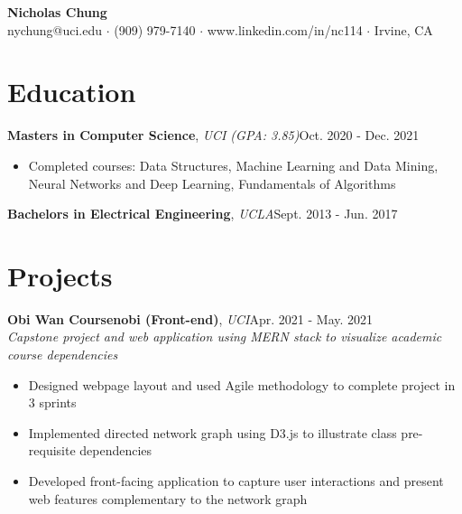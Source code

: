 \documentclass[12pt]{article}
\newcommand\firstboxx[2]{\textbf{\fontsize{12.8}{15}\selectfont #1}, \textit{#2}}
\newcommand{\itemheader}[3]{\firstboxx{#1}{#2}\hfill#3}
\begin{document}
\begin{center}
	\textbf{\LARGE Nicholas Chung} \\ \vspace{.5ex}
	nychung@uci.edu $\cdot$ (909) 979-7140 $\cdot$ www.linkedin.com/in/nc114 $\cdot$ Irvine, CA
\end{center}


\section*{Education}
\vspace*{-1em}\makebox[\linewidth]{\rule{\textwidth}{0.4pt}}
\itemheader{Masters in Computer Science}{UCI (GPA: 3.85)}{Oct. 2020 - Dec. 2021}
\begin{itemize}
\item Completed courses: Data Structures, Machine Learning and Data Mining, Neural Networks and Deep Learning, Fundamentals of Algorithms
\end{itemize}

\smallskip
\itemheader{Bachelors in Electrical Engineering}{UCLA}{Sept. 2013 - Jun. 2017}


\section*{Projects}
\vspace*{-1em}\makebox[\linewidth]{\rule{\textwidth}{0.4pt}}

\itemheader{Obi Wan Coursenobi (Front-end)}{UCI}{Apr. 2021 - May. 2021}
\\ \textit{Capstone project and web application using MERN stack to visualize academic course dependencies}
\begin{itemize}
\item Designed webpage layout and used Agile methodology to complete project in 3 sprints
\item Implemented directed network graph using D3.js to illustrate class pre-requisite dependencies
\item Developed front-facing application to capture user interactions and present web features complementary to the network graph
\end{itemize}
\end{document}
